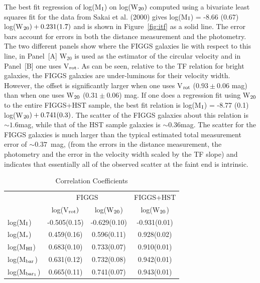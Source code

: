 \documentclass[useAMS,usenatbib]{mn2e}
\begin{document}
  The best fit regression of log(M$_{\rm I}$)  on log(W$_{\rm 20})$ computed using a bivariate least squares fit for the data from Sakai et al. (2000) gives log(M$_{\rm I}$) = -8.66 (0.67) log(W$_{\rm 20}) + 0.231(1.7)$ and is shown in Figure~\ref{fig:itf} as a solid line.
The error bars account for errors in both the distance measurement and the photometry. The two different panels show where the FIGGS galaxies lie with respect to this line, in Panel~[A] W$_{20}$ is used as the estimator of the circular velocity and in Panel~[B] one uses V$_{\rm rot}$. As can be seen, relative to the TF relation for bright galaxies, the FIGGS galaxies are under-luminous for their velocity width. However, the offset is significantly larger when one uses V$_{\rm rot}$ ($0.93 \pm 0.06$ mag) than when one uses W$_{\rm 20}$ ($0.31 \pm 0.06$) mag. If one does a regression fit using W$_{\rm 20}$
to the entire FIGGS+HST sample, the best fit relation is 
log(M$_{\rm I}$) = -8.77 (0.1) log(W$_{\rm 20}) + 0.741(0.3)$. The scatter of the FIGGS galaxies about this relation is $\sim 1.6$mag,
while that of the HST sample galaxies is $\sim 0.36$mag. The scatter for the FIGGS galaxies is much larger than the typical estimated total measurement error of $\sim 0.37$~mag, (from the errors in the distance measurement, the photometry and the error in the velocity width scaled by the TF slope) and indicates that essentially all of the observed scatter at the faint end is intrinsic.

\begin{table}
\caption{Correlation Coefficients}
\label{tab:corrcoef}
\begin{tabular}{lccc}
\hline
                    &\multicolumn{2}{c}{FIGGS}    & FIGGS+HST   \\
                    &log(V$_{\rm rot})$& log(W$_{\rm 20}$) &log(W$_{\rm 20}$) \\
\hline
\hline
log(M$_{\rm I}$)     &-0.505(0.15) &-0.629(0.10)  &-0.931(0.01) \\
log(M$_{*}$)         & 0.459(0.16) & 0.596(0.11)  & 0.928(0.02) \\
log(M$_{\rm HI}$)    & 0.683(0.10) & 0.733(0.07)  & 0.910(0.01) \\
log(M$_{\rm bar}$)   & 0.631(0.12) & 0.732(0.08)  & 0.942(0.01) \\
log(M$_{\rm bar_1}$) & 0.665(0.11) & 0.741(0.07)  & 0.943(0.01) \\
\hline
\end{tabular}
\end{table}
\end{document}
